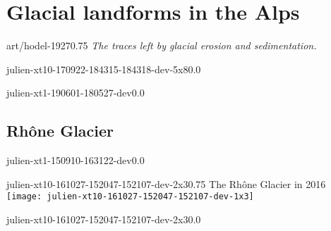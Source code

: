 \documentclass[aspectratio=1610]{beamer}
\begin{document}
\section{Glacial landforms in the Alps}

    \begin{sectionframe}{art/hodel-1927}{0.75}{\insertsectionhead}
      \emph{The traces left by glacial erosion and sedimentation.}
    \end{sectionframe}

    \begin{backgroundframe}[b]{julien-xt10-170922-184315-184318-dev-5x8}{0.0}{}  %
      \flushleft{}
    \end{backgroundframe}

    \begin{backgroundframe}[b]{julien-xt1-190601-180527-dev}{0.0}{}  %
      \flushleft{}
    \end{backgroundframe}


\subsection{Rhône Glacier}

    \begin{backgroundframe}[t]{julien-xt1-150910-163122-dev}{0.0}{}
      \flushright{}
    \end{backgroundframe}

    \begin{backgroundframe}{julien-xt10-161027-152047-152107-dev-2x3}{0.75}
                           {The Rhône Glacier in 2016}
      \vspace{12mm}
      \texttt{[image: julien-xt10-161027-152047-152107-dev-1x3]}
    \end{backgroundframe}

    \begin{backgroundframe}[b]{julien-xt10-161027-152047-152107-dev-2x3}{0.0}{}
      \flushleft{}
    \end{backgroundframe}
\end{document}
